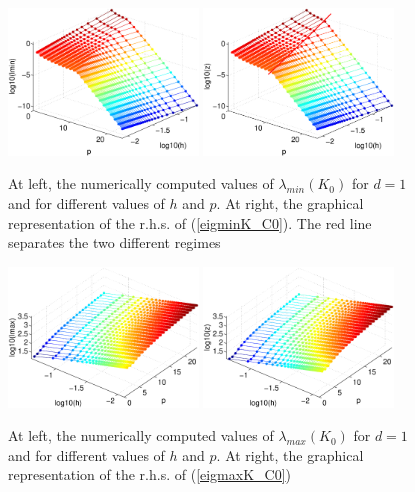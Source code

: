 \documentclass[11pt]{article}
\begin{document}
\begin{figure}[h]
\begin{center}
\includegraphics[width=0.45\textwidth]{Images/iga0_eigK1min.eps}\quad
\includegraphics[width=0.45\textwidth]{Images/iga0_eigK1smin.eps}
\end{center}
\caption{At left, the numerically computed values of
$\lambda_{min}(K_0)$ for $d=1$ and
for different values of $h$ and $p$. At right,
the graphical representation of the r.h.s. of (\ref{eigminK_C0}). The red line
separates the two different regimes}
\label{fig:stiffmin-iga0d1}
\end{figure}

\begin{figure}
\begin{center}
\includegraphics[width=0.45\textwidth]{Images/iga0_eigK1max.eps}\quad
\includegraphics[width=0.45\textwidth]{Images/iga0_eigK1smax.eps}
\end{center}
\caption{At left, the numerically computed values of
$\lambda_{max}(K_0)$ for $d=1$ and
for different values of $h$ and $p$. At right,
the graphical representation of the r.h.s. of (\ref{eigmaxK_C0})}
\label{fig:stiffmax-iga0d1}
\end{figure}
\end{document}
